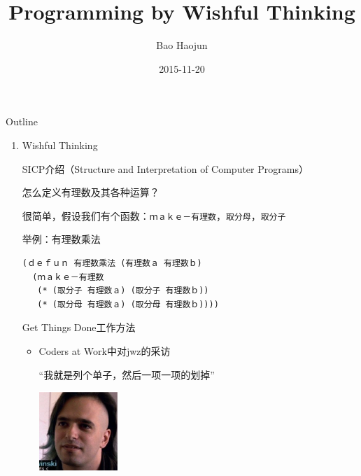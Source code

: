 \documentclass[presentation,dvipdfmx,CJKbookmarks]{beamer}
\author{Bao Haojun}
\date{2015-11-20}
\title{Programming by Wishful Thinking}
\begin{document}
\begin{CJK*}{UTF8}{simsun}

\maketitle
\begin{frame}{Outline}
\tableofcontents
\end{frame}

\CJKtilde

\begin{enumerate}
\item Wishful Thinking
\label{sec:orgcdfff0a}

\begin{frame}[fragile,label={sec:orgf5d949d}]{SICP\thinspace 介绍（Structure and Interpretation of Computer Programs）}
 \begin{block}{怎么定义有理数及其各种运算？}
\end{block}
\begin{block}{很简单，假设我们有\thinspace 个函数：\texttt{ｍａｋｅ－有理数}，\texttt{取分母}，\texttt{取分子}}
\end{block}
\begin{block}{举例：有理数乘法}
\begin{verbatim}
(ｄｅｆｕｎ 有理数乘法 (有理数ａ 有理数ｂ)
  (ｍａｋｅ－有理数
   (* (取分子 有理数ａ) (取分子 有理数ｂ))
   (* (取分母 有理数ａ) (取分母 有理数ｂ))))
\end{verbatim}
\end{block}
\end{frame}

\begin{frame}[label={sec:orgf156ef9}]{Get Things Done\thinspace 工作方法}
\begin{itemize}
\item Coders at Work\thinspace 中对\thinspace jwz\thinspace 的采访

“我就是列个单子，然后一项一项的划掉”

\begin{center}
\includegraphics[width=3cm]{./jwz.ps}
\end{center}


\end{itemize}
\end{frame}
\end{enumerate}
\end{CJK*}
\end{document}
